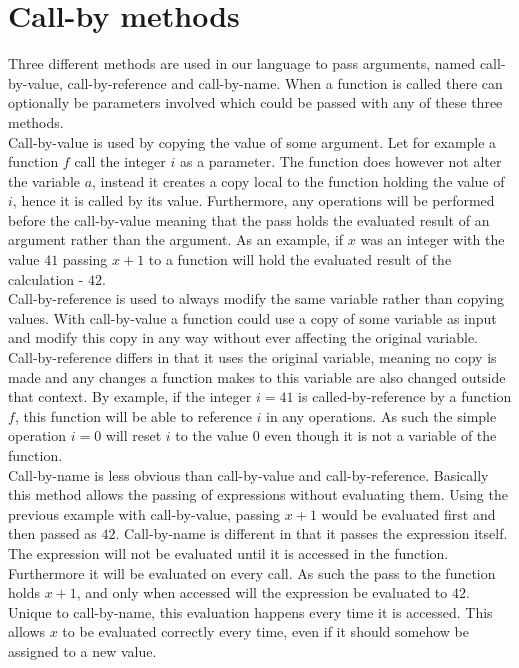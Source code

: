 \section{Call-by methods}
Three different methods are used in our language to pass arguments, named call-by-value, call-by-reference and call-by-name. When a function is called there can optionally be parameters involved which could be passed with any of these three methods.\\
Call-by-value is used by copying the value of some argument. Let for example a function $f$ call the integer $i$ as a parameter. The function does however not alter the variable $a$, instead it creates a copy local to the function holding the value of $i$, hence it is called by its value. Furthermore, any operations will be performed before the call-by-value meaning that the pass holds the evaluated result of an argument rather than the argument. As an example, if $x$ was an integer with the value $41$ passing $x+1$ to a function will hold the evaluated result of the calculation - $42$. \\
Call-by-reference is used to always modify the same variable rather than copying values. With call-by-value a function could use a copy of some variable as input and modify this copy in any way without ever affecting the original variable. Call-by-reference differs in that it uses the original variable, meaning no copy is made and any changes a function makes to this variable are also changed outside that context. By example, if the integer $i = 41$ is called-by-reference by a function $f$, this function will be able to reference $i$ in any operations. As such the simple operation $i = 0$ will reset $i$ to the value $0$ even though it is not a variable of the function. \\
Call-by-name is less obvious than call-by-value and call-by-reference. Basically this method allows the passing of expressions without evaluating them. Using the previous example with call-by-value, passing $x+1$ would be evaluated first and then passed as $42$. Call-by-name is different in that it passes the expression itself. The expression will not be evaluated until it is accessed in the function. Furthermore it will be evaluated on every call. As such the pass to the function holds $x+1$, and only when accessed will the expression be evaluated to $42$. Unique to call-by-name, this evaluation happens every time it is accessed. This allows $x$ to be evaluated correctly every time, even if it should somehow be assigned to a new value.\\
